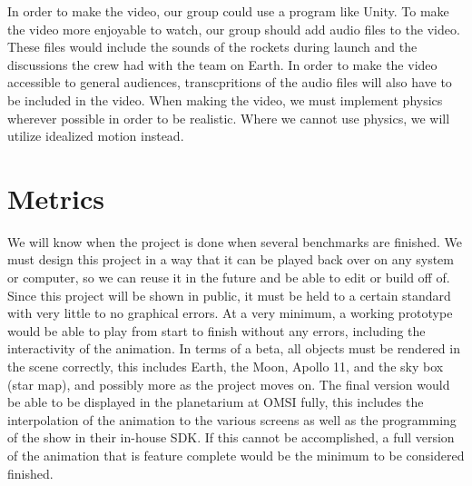 \documentclass[onecolumn, draftclsnofoot,10pt, compsoc]{IEEEtran}
\begin{document}
In order to make the video, our group could use a program like Unity. To make the video more enjoyable to watch, our group should add audio files to the video. These files would include the sounds of the rockets during launch and the discussions the crew had with the team on Earth. In order to make the video accessible to general audiences, transcpritions of the audio files will also have to be included in the video. When making the video, we must implement physics wherever possible in order to be realistic. Where we cannot use physics, we will utilize idealized motion instead.


\section{Metrics}
We will know when the project is done when several benchmarks are finished. We must design this project in a way that it can be played back over on any system or computer, so we can reuse it in the future and be able to edit or build off of. Since this project will be shown in public, it must be held to a certain standard with very little to no graphical errors. At a very minimum, a working prototype would be able to play from start to finish without any errors, including the interactivity of the animation. In terms of a beta, all objects must be rendered in the scene correctly, this includes Earth, the Moon, Apollo 11, and the sky box (star map), and possibly more as the project moves on. The final version would be able to be displayed in the planetarium at OMSI fully, this includes the interpolation of the animation to the various screens as well as the programming of the show in their in-house SDK. If this cannot be accomplished, a full version of the animation that is feature complete would be the minimum to be considered finished. 
\end{document}
